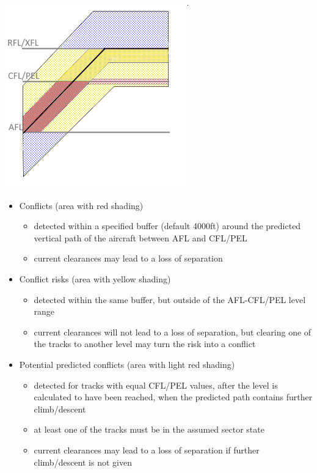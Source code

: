 \documentclass[11pt,a4paper,oldfontcommands]{memoir}
\begin{document}
\includegraphics{img/mtcdv.png}

\begin{itemize}
    \item Conflicts (area with red shading)
    \begin{itemize}
        \item detected within a specified buffer (default 4000ft) around the predicted vertical path of the aircraft between AFL and CFL/PEL
        \item current clearances may lead to a loss of separation
    \end{itemize}
    \item Conflict risks (area with yellow shading)
    \begin{itemize}
        \item detected within the same buffer, but outside of the AFL-CFL/PEL level range
        \item current clearances will not lead to a loss of separation, but clearing one of the tracks to another level may turn the risk into a conflict
    \end{itemize}
    \item Potential predicted conflicts (area with light red shading)
    \begin{itemize}
        \item detected for tracks with equal CFL/PEL values, after the level is calculated to have been reached, when the predicted path contains further climb/descent
        \item at least one of the tracks must be in the assumed sector state
        \item current clearances may lead to a loss of separation if further climb/descent is not given
    \end{itemize}

\end{itemize}
\end{document}
